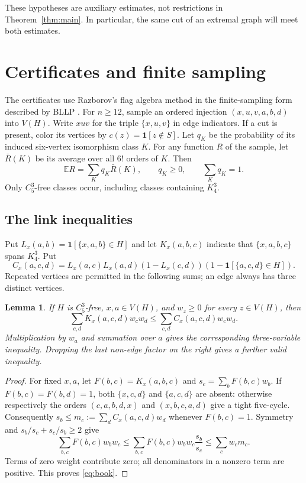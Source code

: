 \documentclass[11pt]{article}
\newtheorem{lemma}[theorem]{Lemma}
\newcommand{\EE}{\mathbb E}
\newcommand{\ind}{\mathbf 1}
\newcommand{\Cfive}{C_5^3}
\begin{document}
These hypotheses are auxiliary estimates, not restrictions in
Theorem~\ref{thm:main}. In particular, the same cut of an extremal graph
will meet both estimates.

\section{Certificates and finite sampling}
The certificates use Razborov's flag algebra method \cite[\S2]{Razborov}
in the finite-sampling form described by BLLP \cite[\S3]{BLLP}. For $n\ge12$, sample an ordered
injection $(x,u,v,a,b,d)$ into $V(H)$. Write $xuv$ for the triple
$\{x,u,v\}$ in edge indicators. If a cut is present, color its
vertices by $c(z)=\ind[z\notin S]$. Let $q_K$ be the probability of its
induced six-vertex isomorphism class $K$. For any function $R$ of the
sample, let $\bar R(K)$ be its average over all $6!$ orders of $K$.
Then
\begin{equation}\label{eq:average}
 \EE R=\sum_Kq_K\bar R(K),\qquad q_K\ge0,\qquad\sum_Kq_K=1.
\end{equation}
Only $\Cfive$-free classes occur, including classes containing $K_4^3$.

\subsection*{The link inequalities}
Put $L_x(a,b)=\ind[\{x,a,b\}\in H]$ and let $K_x(a,b,c)$ indicate
that $\{x,a,b,c\}$ spans $K_4^3$. Put
\[
 C_x(a,c,d)=L_x(a,c)L_x(a,d)(1-L_x(c,d))
                  (1-\ind[\{a,c,d\}\in H]).
\]
Repeated vertices are permitted in the following sums; an edge always
has three distinct vertices.

\begin{lemma}\label{lem:link}
If $H$ is $\Cfive$-free, $x,a\in V(H)$, and $w_z\ge0$ for every
$z\in V(H)$, then
\begin{equation}\label{eq:book}
 \sum_{c,d}K_x(a,c,d)w_cw_d
 \le\sum_{c,d}C_x(a,c,d)w_cw_d.
\end{equation}
Multiplication by $w_a$ and summation over $a$ gives the corresponding
three-variable inequality. Dropping the last non-edge factor on the
right gives a further valid inequality.
\end{lemma}
\begin{proof}
For fixed $x,a$, let $F(b,c)=K_x(a,b,c)$ and
$s_c=\sum_b F(b,c)w_b$. If $F(b,c)=F(b,d)=1$, both $\{x,c,d\}$
and $\{a,c,d\}$ are absent: otherwise respectively the orders
$(c,a,b,d,x)$ and $(x,b,c,a,d)$ give a tight five-cycle.
Consequently $s_b\le m_c:=\sum_d C_x(a,c,d)w_d$ whenever $F(b,c)=1$.
Symmetry and $s_b/s_c+s_c/s_b\ge2$ give
\[
 \sum_{b,c}F(b,c)w_bw_c
 \le\sum_{b,c}F(b,c)w_bw_c\frac{s_b}{s_c}
 \le\sum_c w_cm_c.
\]
Terms of zero weight contribute zero; all denominators in a nonzero term
are positive. This proves \eqref{eq:book}.
\end{proof}
\end{document}
